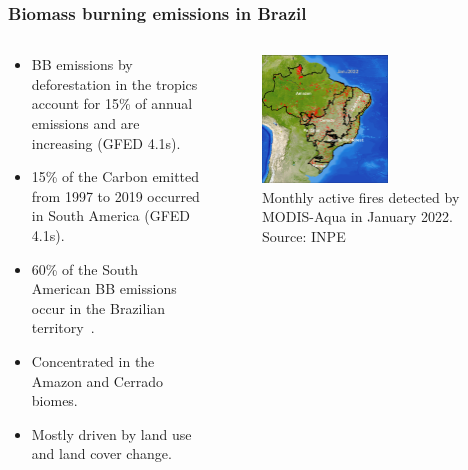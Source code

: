 \documentclass[aspectratio=169]{beamer}
\begin{document}
\begin{frame}
  \frametitle{Biomass burning emissions in Brazil}
  \begin{columns}
    \begin{column}{0.4\textwidth}
      \begin{itemize}
        \item BB emissions by deforestation in the tropics account for 15\% of 
          annual emissions and are increasing (GFED 4.1s).
        \item 15\% of the Carbon emitted from 1997 to 2019 occurred
          in South America (GFED 4.1s).
        \item 60\% of the South American BB emissions occur in the Brazilian
          territory~\cite{santos2021}.
        \item Concentrated in the Amazon and Cerrado biomes.
        \item Mostly driven by land use and land cover change.
      \end{itemize}
    \end{column}
    \begin{column}{0.6\textwidth}
      \begin{figure}
        \centering
        \includegraphics[width=0.6\textwidth]{img/monthly_active_fires.png}
        \caption{Monthly active fires detected by MODIS-Aqua in January 2022. 
        Source: INPE}
        \label{fig:monthly_active_fires}
      \end{figure}
    \end{column}
  \end{columns}
\end{frame}
\end{document}
